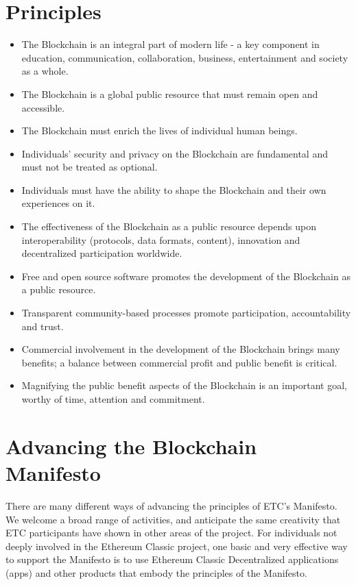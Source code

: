 \documentclass[twoside,twocolumn]{article}
\begin{document}
\section{Principles}
\begin{itemize}
  \item The Blockchain is an integral part of modern life - a key component in
  education, communication, collaboration, business, entertainment and society
  as a whole.
  \item The Blockchain is a global public resource that must remain open and
  accessible.
  \item The Blockchain must enrich the lives of individual human beings.
  \item Individuals’ security and privacy on the Blockchain are fundamental and
must not be treated as optional.
  \item Individuals must have the ability to shape the Blockchain and their own
experiences on it.
  \item The effectiveness of the Blockchain as a public resource depends upon
interoperability (protocols, data formats, content), innovation and
decentralized participation worldwide.
  \item Free and open source software promotes the development of the Blockchain
as a public resource.
  \item Transparent community-based processes promote participation,
  accountability and trust.
  \item Commercial involvement in the development of the Blockchain brings many
 benefits; a balance between commercial profit and public benefit is critical.
  \item Magnifying the public benefit aspects of the Blockchain is an important
   goal, worthy of time, attention and commitment.
\end{itemize}

\section{Advancing the Blockchain Manifesto}
There are many different ways of advancing the principles of ETC's
Manifesto. We welcome a broad range of activities, and anticipate the same
creativity that ETC participants have shown in other areas of the project.
For individuals not deeply involved in the Ethereum Classic project,
one basic and very effective way to support the Manifesto is to use
Ethereum Classic Decentralized applications ({\DH}apps) and other products that
embody the principles of the Manifesto.
\end{document}
